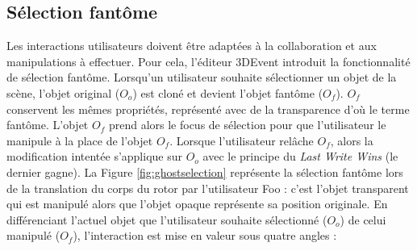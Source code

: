 \subsection{Sélection fantôme}
Les interactions utilisateurs doivent être adaptées à la collaboration et aux 
manipulations à effectuer. Pour cela, l'éditeur 3DEvent introduit la fonctionnalité de 
sélection \og fantôme\fg{}. Lorsqu'un utilisateur souhaite sélectionner un objet de 
la scène, l'objet original ($O_o$) est 
cloné et devient l'objet fantôme ($O_f$). $O_f$ conservent les mêmes propriétés, 
représenté avec de la 
transparence d'où le terme \og fantôme\fg{}. 
L'objet $O_f$ prend alors le focus de sélection pour que l'utilisateur le manipule à 
la place de l'objet $O_f$. 
Lorsque l'utilisateur relâche $O_f$, alors la modification intentée s'applique sur 
$O_o$ avec le principe du \textit{Last Write Wins} (le dernier gagne).
La Figure \ref{fig:ghostselection} 
représente la sélection fantôme lors de la translation du corps du rotor par 
l'utilisateur Foo : c'est l'objet transparent qui est manipulé alors que l'objet opaque 
représente sa position originale. 
En différenciant l'actuel objet que l'utilisateur souhaite sélectionné ($O_{o}$) de 
celui manipulé ($O_f$), l'interaction est mise en valeur sous quatre angles :
